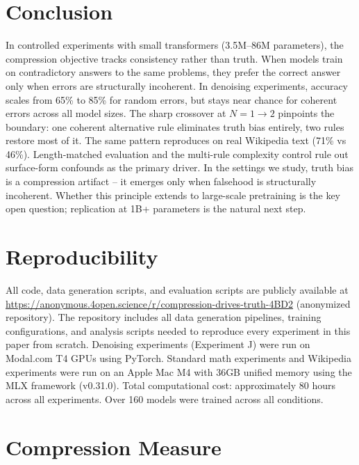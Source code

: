 \documentclass[10pt]{article} %
\begin{document}
\section{Conclusion}
\label{sec:conclusion}

In controlled experiments with small transformers (3.5M--86M parameters), the compression objective tracks consistency rather than truth. When models train on contradictory answers to the same problems, they prefer the correct answer only when errors are structurally incoherent. In denoising experiments, accuracy scales from 65\% to 85\% for random errors, but stays near chance for coherent errors across all model sizes. The sharp crossover at $N{=}1 \to 2$ pinpoints the boundary: one coherent alternative rule eliminates truth bias entirely, two rules restore most of it. The same pattern reproduces on real Wikipedia text (71\% vs 46\%). Length-matched evaluation and the multi-rule complexity control rule out surface-form confounds as the primary driver. In the settings we study, truth bias is a compression artifact -- it emerges only when falsehood is structurally incoherent. Whether this principle extends to large-scale pretraining is the key open question; replication at 1B+ parameters is the natural next step.




\appendix

\section{Reproducibility}
\label{app:reproducibility}

All code, data generation scripts, and evaluation scripts are publicly available at \url{https://anonymous.4open.science/r/compression-drives-truth-4BD2} (anonymized repository). The repository includes all data generation pipelines, training configurations, and analysis scripts needed to reproduce every experiment in this paper from scratch. Denoising experiments (Experiment J) were run on Modal.com T4 GPUs using PyTorch. Standard math experiments and Wikipedia experiments were run on an Apple Mac M4 with 36GB unified memory using the MLX framework (v0.31.0). Total computational cost: approximately 80 hours across all experiments. Over 160 models were trained across all conditions.

\section{Compression Measure}
\label{app:compression}
\end{document}
